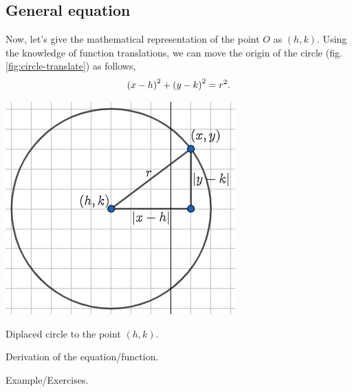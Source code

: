 \documentclass[../main-notes.tex]{subfiles}
\begin{document}
\subsection{General equation}

Now, let's give the mathematical representation of the point $O$ as $(h,k)$.
Using the knowledge of function translations, we can move the origin of the circle (fig.\ref{fig:circle-translate}) as follows,
\begin{gather*}
    \qty(x-h)^2 + \qty(y-k)^2 = r^2.
\end{gather*}

\begin{marginfigure}
    \centering
    \includegraphics[widht=0.45\textwidth]{../Figures/circunference/circle-translate.jpg}
    \caption{Diplaced circle to the point $(h,k)$.}\label{fig:circle-translate}
\end{marginfigure}


Derivation of the equation/function.

Example/Exercises.
\end{document}
